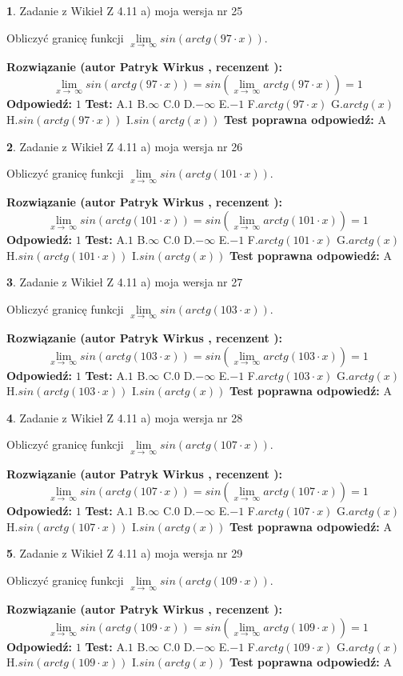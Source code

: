 \documentclass[12pt, a4paper]{article}
\theoremstyle{definition} %
\newtheorem{zad}{}
\newcommand{\zadStart}[1]{\begin{zad}#1\newline}
\newcommand{\zadStop}{\end{zad}}
\newcommand{\rozwStart}[2]{\noindent \textbf{Rozwiązanie (autor #1 , recenzent #2): }\newline}
\newcommand{\rozwStop}{\newline}
\newcommand{\odpStart}{\noindent \textbf{Odpowiedź:}\newline}
\newcommand{\odpStop}{\newline}
\newcommand{\testStart}{\noindent \textbf{Test:}\newline}
\newcommand{\testStop}{\newline}
\newcommand{\kluczStart}{\noindent \textbf{Test poprawna odpowiedź:}\newline}
\newcommand{\kluczStop}{\newline}
\begin{document}
\zadStart{Zadanie z Wikieł Z 4.11 a) moja wersja nr 25}

Obliczyć granicę funkcji  $\lim\limits_{x\to\ \infty}sin(arctg(97\cdot x))$.
\zadStop
\rozwStart{Patryk Wirkus}{}
$$\lim\limits_{x\to\ \infty}sin(arctg(97\cdot x)) = sin(\lim\limits_{x\to\ \infty}arctg(97\cdot x)) = 1$$
\rozwStop
\odpStart
$1$
\odpStop
\testStart
A.$1$ B.$\infty$ C.$0$ D.$-\infty$ E.$-1$
F.$arctg(97\cdot x)$ G.$arctg(x)$
H.$sin(arctg(97\cdot x))$
I.$sin(arctg(x))$
\testStop
\kluczStart
A
\kluczStop



\zadStart{Zadanie z Wikieł Z 4.11 a) moja wersja nr 26}

Obliczyć granicę funkcji  $\lim\limits_{x\to\ \infty}sin(arctg(101\cdot x))$.
\zadStop
\rozwStart{Patryk Wirkus}{}
$$\lim\limits_{x\to\ \infty}sin(arctg(101\cdot x)) = sin(\lim\limits_{x\to\ \infty}arctg(101\cdot x)) = 1$$
\rozwStop
\odpStart
$1$
\odpStop
\testStart
A.$1$ B.$\infty$ C.$0$ D.$-\infty$ E.$-1$
F.$arctg(101\cdot x)$ G.$arctg(x)$
H.$sin(arctg(101\cdot x))$
I.$sin(arctg(x))$
\testStop
\kluczStart
A
\kluczStop



\zadStart{Zadanie z Wikieł Z 4.11 a) moja wersja nr 27}

Obliczyć granicę funkcji  $\lim\limits_{x\to\ \infty}sin(arctg(103\cdot x))$.
\zadStop
\rozwStart{Patryk Wirkus}{}
$$\lim\limits_{x\to\ \infty}sin(arctg(103\cdot x)) = sin(\lim\limits_{x\to\ \infty}arctg(103\cdot x)) = 1$$
\rozwStop
\odpStart
$1$
\odpStop
\testStart
A.$1$ B.$\infty$ C.$0$ D.$-\infty$ E.$-1$
F.$arctg(103\cdot x)$ G.$arctg(x)$
H.$sin(arctg(103\cdot x))$
I.$sin(arctg(x))$
\testStop
\kluczStart
A
\kluczStop



\zadStart{Zadanie z Wikieł Z 4.11 a) moja wersja nr 28}

Obliczyć granicę funkcji  $\lim\limits_{x\to\ \infty}sin(arctg(107\cdot x))$.
\zadStop
\rozwStart{Patryk Wirkus}{}
$$\lim\limits_{x\to\ \infty}sin(arctg(107\cdot x)) = sin(\lim\limits_{x\to\ \infty}arctg(107\cdot x)) = 1$$
\rozwStop
\odpStart
$1$
\odpStop
\testStart
A.$1$ B.$\infty$ C.$0$ D.$-\infty$ E.$-1$
F.$arctg(107\cdot x)$ G.$arctg(x)$
H.$sin(arctg(107\cdot x))$
I.$sin(arctg(x))$
\testStop
\kluczStart
A
\kluczStop



\zadStart{Zadanie z Wikieł Z 4.11 a) moja wersja nr 29}

Obliczyć granicę funkcji  $\lim\limits_{x\to\ \infty}sin(arctg(109\cdot x))$.
\zadStop
\rozwStart{Patryk Wirkus}{}
$$\lim\limits_{x\to\ \infty}sin(arctg(109\cdot x)) = sin(\lim\limits_{x\to\ \infty}arctg(109\cdot x)) = 1$$
\rozwStop
\odpStart
$1$
\odpStop
\testStart
A.$1$ B.$\infty$ C.$0$ D.$-\infty$ E.$-1$
F.$arctg(109\cdot x)$ G.$arctg(x)$
H.$sin(arctg(109\cdot x))$
I.$sin(arctg(x))$
\testStop
\kluczStart
A
\kluczStop
\end{document}
